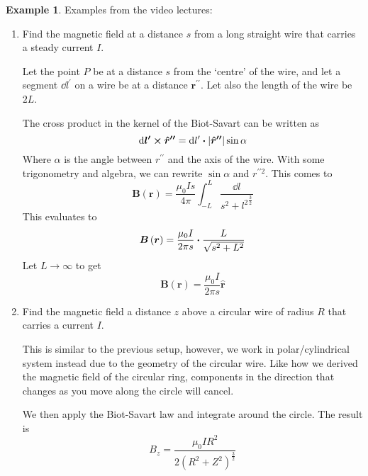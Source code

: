 \documentclass[12pt,chapterprefix=false,dvipsnames]{scrbook}
\theoremstyle{dotless}
\theoremstyle{definition}
\newtheorem{protoexample}{Example}[section]
\newenvironment{example}
{\colorlet{shadecolor}{red!15}\begin{shaded}\begin{protoexample}}
			{\end{protoexample}\end{shaded}}
\begin{document}
\begin{example}
	Examples from the video lectures:
	\begin{enumerate}
		\item Find the magnetic field at a distance $s$
		      from a long straight wire that carries a steady current
		      $I$.

		      Let the point $P$ be at a distance
		      $s$ from the `centre' of the wire, and let a
		      segment $\dd{l^\prime}$ on a wire be at a distance
		      $\bm{r^{\prime\prime}}$. Let also the length of the wire be
		      $2 L$.

		      The cross product in the kernel of the Biot-Savart can be
		      written as
		      \begin{equation}
			      \dd{\bm{l^\prime}}\cross\bm{\hat{r}^{\prime\prime}}
			      =
			      \dd{l^\prime}\vdot\absolutevalue{\bm{\hat{r}^{\prime\prime}}}
			      \sin{\alpha}
		      \end{equation}
		      Where $\alpha$ is the angle between
		      $r^{\prime\prime}$ and the axis of the wire. With some
		      trigonometry and algebra, we can rewrite $\sin\alpha$
		      and $r^{\prime\prime 2}$. This comes to
		      \begin{equation}
			      \bm{B}\left(\bm{r}\right)
			      =
			      \frac{\mu_0 I s}{4\pi}\int^L_{-L}\frac{\dd{l}}{{s^2 + l^2}^{\frac{3}{2}}}
		      \end{equation}
		      This evaluates to
		      \begin{equation}
			      \bm{B}\left(\bm{r}\right)
			      =
			      \frac{\mu_0 I}{2\pi s}\vdot\frac{L}{\sqrt{s^2+L^2}}
		      \end{equation}
		      Let $L \rightarrow \infty$ to get
		      \begin{equation}
			      \bm{B}\left(\bm{r}\right)
			      =
			      \frac{\mu_0 I}{2\pi s}\bm{\hat{r}}
		      \end{equation}

		\item Find the magnetic field a distance $z$ above
		      a circular wire of radius $R$ that carries a
		      current $I$.

		      This is similar to the previous setup, however, we work in
		      polar/cylindrical system instead due to the geometry of the
		      circular wire. Like how we derived the magnetic field of the
		      circular ring, components in the direction that changes as you
		      move along the circle will cancel.

		      We then apply the Biot-Savart law and integrate around the
		      circle. The result is
		      \begin{equation}
			      B_z = \frac{\mu_0 I R^2}{2 {\left(R^2 + Z^2 \right)}^{\frac{3}{2}}}
		      \end{equation}

	\end{enumerate}

\end{example}
\end{document}
